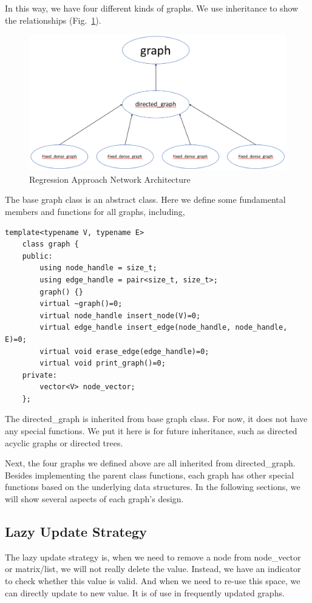 \documentclass[]{article}
\begin{document}
In this way, we have four different kinds of graphs. We use inheritance to show the relationships (Fig.~\ref{fig:graph}).
\begin{figure}
	\centering
	\includegraphics[scale=0.4]{graph.png}
	\caption{Regression Approach Network Architecture}
	
	\label{fig:graph}
\end{figure}
The base graph class is an abstract class. Here we define some fundamental members and functions for all graphs, including,
\begin{lstlisting}
template<typename V, typename E>
    class graph {        
    public:     
        using node_handle = size_t;
        using edge_handle = pair<size_t, size_t>;   
        graph() {}
        virtual ~graph()=0;
        virtual node_handle insert_node(V)=0;
        virtual edge_handle insert_edge(node_handle, node_handle, E)=0;
        virtual void erase_edge(edge_handle)=0;
        virtual void print_graph()=0;
    private:
        vector<V> node_vector;
    };
\end{lstlisting}
The directed\_graph is inherited from base graph class. For now, it does not have any special functions. We put it here is for future inheritance, such as directed acyclic graphs or directed trees.

Next, the four graphs we defined above are all inherited from directed\_graph. Besides implementing the parent class functions, each graph has other special functions based on the underlying data structures. In the following sections, we will show several aspects of each graph's design.
\subsection {Lazy Update Strategy}
The lazy update strategy is, when we need to remove a node from node\_vector or matrix/list, we will not really delete the value. Instead, we have an indicator to check whether this value is valid. And when we need to re-use this space, we can directly update to new value. It is of use in frequently updated graphs.
\end{document}
